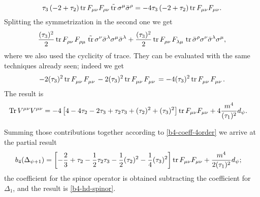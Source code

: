 \begin{equation}
\tau_3  \left(-2 + {\tau_2} \right) 
	\operatorname{tr} F_{\mu\nu} F_{\rho \nu}
	\operatorname{\tilde{tr}} \sigma^\mu \bar \sigma^\rho 
= 
- 4 \tau_3  \left(-2 + {\tau_2} \right)  \operatorname{tr}  F_{\mu\nu} F_{\mu \nu}.
\end{equation}
Splitting the symmetrization in the second one we get
\begin{equation}
\frac{(\tau_3)^2}{2} \tr F\indices{_{\rho\nu }} F\indices{_{ \rho }_\mu } 
\str \sigma^\nu \bar\sigma^{\lambda} \sigma^\mu \bar\sigma^{ \lambda }
+
\frac{(\tau_3)^2}{2}  \tr F\indices{_{\rho\nu }} F\indices{_{\lambda}_\mu } 
 \tr \bar\sigma^{\rho} \sigma^\nu \bar\sigma^{\lambda} \sigma^\mu ,
\end{equation}
where we also used the cyclicity of trace. They can be evaluated with the same techniques already seen; indeed we get
\begin{equation}
- 2 {(\tau_3)^2} \tr F\indices{_{\mu\nu }} F\indices{_{ \mu }_\nu } 
- 2  {(\tau_3)^2} \tr F\indices{_{\mu\nu }} F\indices{_{\mu}_\nu }  
= - 4 (\tau_3)^2 \tr F\indices{_{\mu\nu }} F\indices{_{\mu}_\nu }  .
\end{equation}
The result is
\begin{equation}
\begin{split}
\operatorname{Tr} V^{\mu\nu}V^{\mu\nu}
&	=
-4 \left[
	4 
	-4 \tau_2  
	-2 \tau_3 
	+ \tau_2 \tau_3
	+ (\tau_2)^2
	+ (\tau_3)^2  
\right] 
\operatorname{tr}  F_{\mu\nu} F_{\mu \nu} 
+ 4 \frac{m^4}{(\tau_{1})^2}d_{\psi} .
\end{split}
\end{equation}


Summing those contributions together according to \eqref{b4-coeff-4order} we arrive at the partial result
\begin{equation}
\begin{split}
b_4(\Delta_{\psi+1})
& =
\left[
-\frac{2}{3}	
+ \tau_2
- \frac{1}{2} \tau_2 \tau_3
- \frac{1}{2}	(\tau_2)^2
- \frac{1}{4} (\tau_3)^2
\right]
\operatorname{tr} F_{\mu\nu}  F_{\mu\nu}
+  \frac{m^4}{2(\tau_{1})^2}d_{\psi} 
;
\end{split}
\end{equation}
the coefficient for the spinor operator is obtained subtracting the coefficient for $\Delta_1$, and the result is \eqref{b4-hd-spinor}.



